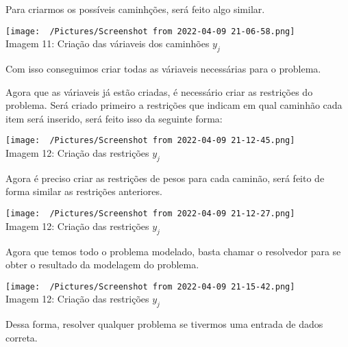   Para criarmos os possíveis caminhções, será feito algo similar.
  \begin{center}
    \texttt{[image: ~/Pictures/Screenshot from 2022-04-09 21-06-58.png]}\\
    Imagem 11: Criação das váriaveis dos caminhões \(y_{j}\)
  \end{center}
  Com isso conseguimos criar todas as váriaveis necessárias para o problema.

  Agora que as váriaveis já estão criadas, é necessário criar as restrições do problema. 
  Será criado primeiro a restrições que indicam em qual caminhão cada item será inserido, será feito isso da seguinte forma:
  \begin{center}
    \texttt{[image: ~/Pictures/Screenshot from 2022-04-09 21-12-45.png]}\\
    Imagem 12: Criação das restrições \(y_{j}\)
  \end{center}
  Agora é preciso criar as restrições de pesos para cada caminão, será feito de forma similar as restrições anteriores.
  \begin{center}
    \texttt{[image: ~/Pictures/Screenshot from 2022-04-09 21-12-27.png]}\\
    Imagem 12: Criação das restrições \(y_{j}\)
  \end{center}

  Agora que temos todo o problema modelado, basta chamar o resolvedor para se obter o resultado da modelagem do problema. 
  \begin{center}
    \texttt{[image: ~/Pictures/Screenshot from 2022-04-09 21-15-42.png]}\\
    Imagem 12: Criação das restrições \(y_{j}\)
  \end{center}
  Dessa forma, resolver qualquer problema se tivermos uma entrada de dados correta.
